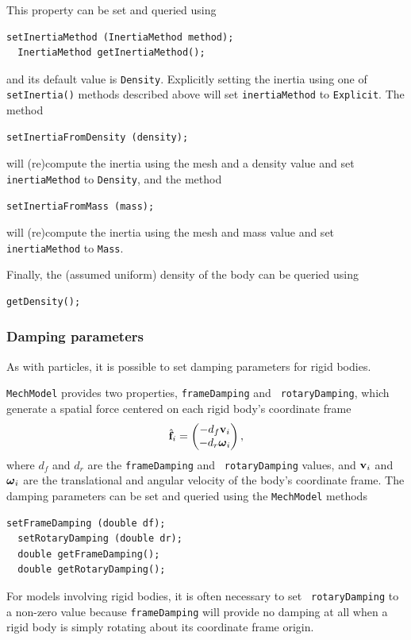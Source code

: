 This property can be set and queried using
%
\begin{lstlisting}[]
  setInertiaMethod (InertiaMethod method);
  InertiaMethod getInertiaMethod();
\end{lstlisting}
%
and its default value is {\tt Density}. Explicitly setting the
inertia using one of {\tt setInertia()} methods described above will
set {\tt inertiaMethod} to {\tt Explicit}. The method
%
\begin{lstlisting}[]
  setInertiaFromDensity (density); 
\end{lstlisting}
%
will (re)compute the inertia using the mesh and a density value
and set {\tt inertiaMethod} to {\tt Density}, and
the method
%
\begin{lstlisting}[]
  setInertiaFromMass (mass); 
\end{lstlisting}
%
will (re)compute the inertia using the mesh and mass value
and set {\tt inertiaMethod} to {\tt Mass}.

Finally, the (assumed uniform) density of the body can be queried
using
%
\begin{lstlisting}[]
   getDensity();
\end{lstlisting}
%

\subsubsection{Damping parameters}
\label{RigidBodyDamping:sec}

As with particles, it is possible to set damping parameters for rigid
bodies. 

{\tt MechModel} provides two properties, {\tt frameDamping} and {\tt
rotaryDamping}, which generate a spatial force centered on each rigid
body's coordinate frame
%
\begin{equation}
\hat{{\bf f}}_i = \left(\begin{matrix} -d_f {\bf v}_i \\ -d_r \boldsymbol\omega_i \end{matrix}\right),
\end{equation}
%
where $d_f$ and $d_r$ are the {\tt frameDamping} and {\tt
rotaryDamping} values, and ${\bf v}_i$ and $\boldsymbol\omega_i$ are the translational
and angular velocity of the body's coordinate frame.
The damping parameters can be set and queried using the {\tt MechModel}
methods
%
\begin{lstlisting}[]
  setFrameDamping (double df);
  setRotaryDamping (double dr);
  double getFrameDamping();
  double getRotaryDamping();
\end{lstlisting}
%
\begin{sideblock}
For models involving rigid bodies, it is often necessary to set {\tt
rotaryDamping} to a non-zero value because {\tt frameDamping} will
provide no damping at all when a rigid body is simply rotating about
its coordinate frame origin.
\end{sideblock}


